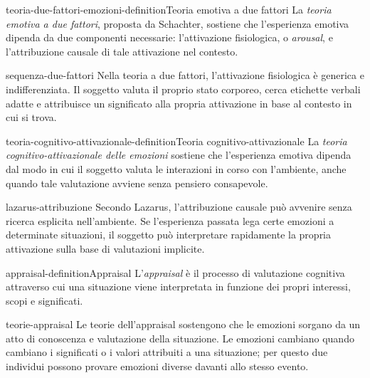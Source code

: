 \documentclass[preview]{standalone}
\begin{document}
\begin{snippetdefinition}{teoria-due-fattori-emozioni-definition}{Teoria emotiva a due fattori}
    La \emph{teoria emotiva a due fattori}, proposta da Schachter, sostiene che
    l'esperienza emotiva dipenda da due componenti necessarie: l'attivazione
    fisiologica, o \emph{arousal}, e l'attribuzione causale di tale attivazione
    nel contesto.
\end{snippetdefinition}

\begin{snippet}{sequenza-due-fattori}
    Nella teoria a due fattori, l'attivazione fisiologica è generica e
    indifferenziata. Il soggetto valuta il proprio stato corporeo, cerca
    etichette verbali adatte e attribuisce un significato alla propria
    attivazione in base al contesto in cui si trova.
\end{snippet}

\begin{snippetdefinition}{teoria-cognitivo-attivazionale-definition}{Teoria cognitivo-attivazionale}
    La \emph{teoria cognitivo-attivazionale delle emozioni} sostiene che
    l'esperienza emotiva dipenda dal modo in cui il soggetto valuta le
    interazioni in corso con l'ambiente, anche quando tale valutazione avviene
    senza pensiero consapevole.
\end{snippetdefinition}

\begin{snippet}{lazarus-attribuzione}
    Secondo Lazarus, l'attribuzione causale può avvenire senza ricerca esplicita
    nell'ambiente. Se l'esperienza passata lega certe emozioni a determinate
    situazioni, il soggetto può interpretare rapidamente la propria attivazione
    sulla base di valutazioni implicite.
\end{snippet}

\begin{snippetdefinition}{appraisal-definition}{Appraisal}
    L'\emph{appraisal} è il processo di valutazione cognitiva attraverso cui una
    situazione viene interpretata in funzione dei propri interessi, scopi e
    significati.
\end{snippetdefinition}

\begin{snippet}{teorie-appraisal}
    Le teorie dell'appraisal sostengono che le emozioni sorgano da un atto di
    conoscenza e valutazione della situazione. Le emozioni cambiano quando
    cambiano i significati o i valori attribuiti a una situazione; per questo
    due individui possono provare emozioni diverse davanti allo stesso evento.
\end{snippet}
\end{document}
